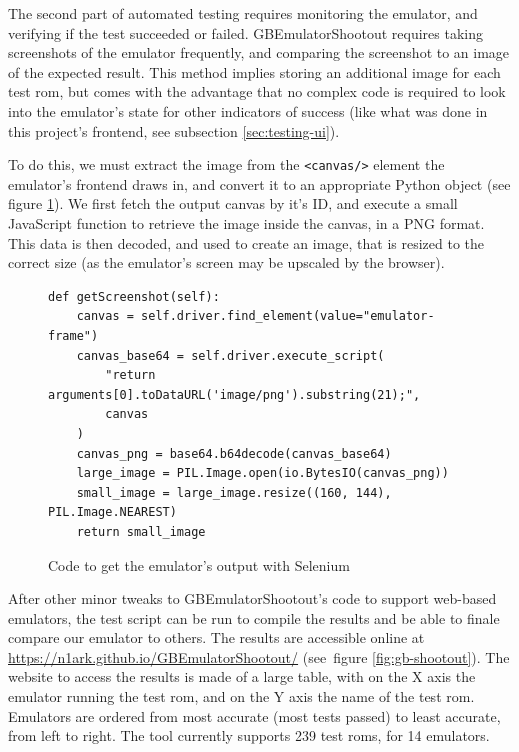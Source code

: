 \documentclass[11pt]{informatics-report}
\begin{document}
The second part of automated testing requires monitoring the emulator, and verifying if the test succeeded or failed. GBEmulatorShootout requires taking screenshots of the emulator frequently, and comparing the screenshot to an image of the expected result. This method implies storing an additional image for each test \gls{rom}, but comes with the advantage that no complex code is required to look into the emulator's state for other indicators of success (like what was done in this project's frontend, see subsection \ref{sec:testing-ui}).

To do this, we must extract the image from the \texttt{<canvas/>} element the emulator's frontend draws in, and convert it to an appropriate Python object (see figure \ref{fig:selenium-screenshot}). We first fetch the output canvas by it's ID, and execute a small JavaScript function to retrieve the image inside the canvas, in a PNG format. This data is then decoded, and used to create an image, that is resized to the correct size (as the emulator's screen may be upscaled by the browser).

\begin{figure}[h]
    \begin{verbatim}
def getScreenshot(self):
    canvas = self.driver.find_element(value="emulator-frame")
    canvas_base64 = self.driver.execute_script(
    	"return arguments[0].toDataURL('image/png').substring(21);", 
    	canvas
    )
    canvas_png = base64.b64decode(canvas_base64)
    large_image = PIL.Image.open(io.BytesIO(canvas_png))
    small_image = large_image.resize((160, 144), PIL.Image.NEAREST)
    return small_image
    \end{verbatim}
    \caption{Code to get the emulator's output with Selenium}
    \label{fig:selenium-screenshot}
\end{figure}

After other minor tweaks to GBEmulatorShootout's code to support web-based emulators, the test script can be run to compile the results and be able to finale compare our emulator to others. The results are accessible online at \url{https://n1ark.github.io/GBEmulatorShootout/} (see~figure \ref{fig:gb-shootout}). The website to access the results is made of a large table, with on the X axis the emulator running the test \gls{rom}, and on the Y axis the name of the test \gls{rom}. Emulators are ordered from most accurate (most tests passed) to least accurate, from left to right. The tool currently supports 239 test \glspl{rom}, for 14 emulators.
\end{document}
